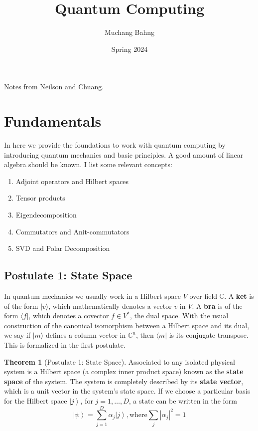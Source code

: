 \documentclass{article}
\newcommand{\ket}[1]{\ensuremath{\left|#1\right\rangle}}
\theoremstyle{definition}
\newtheorem{theorem}{Theorem}[section]
\begin{document}
\pagestyle{fancy}

\cfoot{\thepage / \pageref{LastPage}}

\title{Quantum Computing}
\author{Muchang Bahng}
\date{Spring 2024}

\maketitle
\tableofcontents
\pagebreak 

Notes from Neilson and Chuang.

\section{Fundamentals}

  In here we provide the foundations to work with quantum computing by introducing quantum mechanics and basic principles. A good amount of linear algebra should be known. I list some relevant concepts: 
  
  \begin{enumerate}
    \item Adjoint operators and Hilbert spaces 
    \item Tensor products
    \item Eigendecomposition 
    \item Commutators and Anit-commutators 
    \item SVD and Polar Decomposition 
  \end{enumerate}

  \subsection{Postulate 1: State Space}

    In quantum mechanics we usually work in a Hilbert space $V$ over field $\mathbb{C}$. A \textbf{ket} is of the form $| v \rangle$, which mathematically denotes a vector $v$ in $V$. A \textbf{bra} is of the form $\langle f |$, which denotes a covector $f \in V^\ast$, the dual space. With the usual construction of the canonical isomorphism between a Hilbert space and its dual, we say if $| m \rangle$ defines a column vector in $\mathbb{C}^n$, then $\langle m |$ is its conjugate transpose. This is formalized in the first postulate. 

    \begin{theorem}[Postulate 1: State Space]
      Associated to any isolated physical system is a Hilbert space (a complex inner product space) known as the \textbf{state space} of the system. The system is completely described by its \textbf{state vector}, which is a unit vector in the system's state space. If we choose a particular basis for the Hilbert space $\ket{j}$, for $j = 1, \ldots, D$, a state can be written in the form 
      \begin{equation}
        \ket{\psi} = \sum_{j=1}^D \alpha_j \ket{j}, \text{where} \sum_{j} |\alpha_j|^2 = 1 
        \label{eq:pos_1}
      \end{equation}
    \end{theorem}
\end{document}
